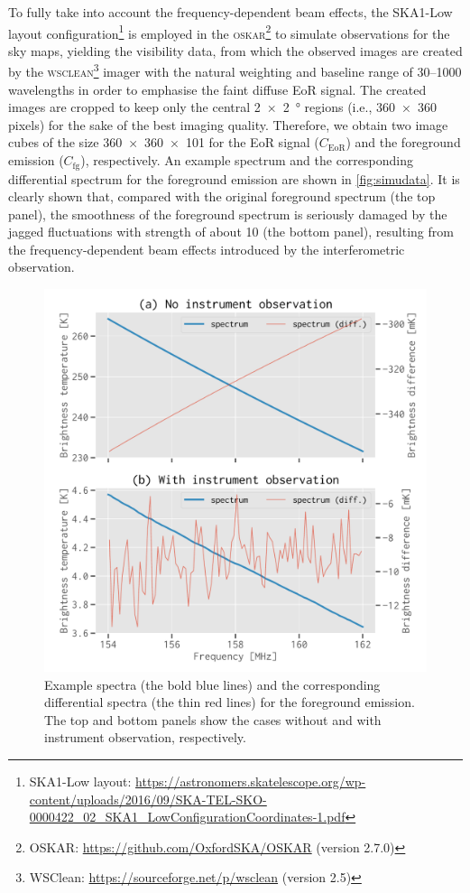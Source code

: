 \documentclass[letters,fleqn,usenatbib,onecolumn]{mnras}
\newcommand{\R}[1]{\mathrm{#1}}
\begin{document}
To fully take into account the frequency-dependent beam effects,
the SKA1-Low layout configuration\footnote{\raggedright%
  SKA1-Low layout:
  \url{https://astronomers.skatelescope.org/wp-content/uploads/2016/09/SKA-TEL-SKO-0000422_02_SKA1_LowConfigurationCoordinates-1.pdf}}
is employed in the \textsc{oskar}\footnote{%
  OSKAR: \url{https://github.com/OxfordSKA/OSKAR} (version 2.7.0)}
\citep{mort2010} to simulate observations for the sky maps,
yielding the visibility data, from which the observed images are created
by the \textsc{wsclean}\footnote{%
  WSClean: \url{https://sourceforge.net/p/wsclean} (version 2.5)}
imager \citep{offringa2014} with the natural weighting and baseline
range of \numrange{30}{1000} wavelengths in order to emphasise the
faint diffuse EoR signal.
The created images are cropped to keep only the central
\SI{2 x 2}{\degree} regions (i.e., \num{360 x 360} pixels) for the sake
of the best imaging quality.
Therefore, we obtain two image cubes of the size \num{360 x 360 x 101}
for the EoR signal ($C_{\R{EoR}}$) and the foreground emission
($C_{\R{fg}}$), respectively.
An example spectrum and the corresponding differential spectrum for
the foreground emission are shown in \autoref{fig:simudata}.
It is clearly shown that, compared with the original foreground spectrum
(the top panel),
{\color{cyan}%
the smoothness of the foreground spectrum is seriously damaged by the
jagged fluctuations with strength of about \SI{10}{\mK}
(the bottom panel),
resulting from the frequency-dependent beam effects introduced by the
interferometric observation.}

\begin{figure}
  \centering
  \includegraphics[width=\myfigwidth]{simudata}
  \caption{\label{fig:simudata}%
    Example spectra (the bold blue lines) and the corresponding
    differential spectra (the thin red lines) for the foreground
    emission.
    The top and bottom panels show the cases without and with
    instrument observation, respectively.
  }
\end{figure}
\end{document}
